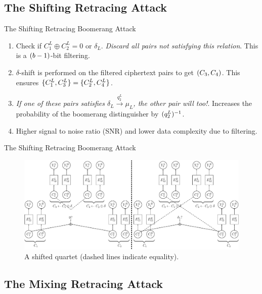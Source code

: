 \documentclass[notheorems]{beamer}
\theoremstyle{definition}
\theoremstyle{example}
\begin{document}
    \subsection{The Shifting Retracing Attack}
    \label{subsec:shift-retr-boomerang}

    \begin{frame}[<+->]{The Shifting Retracing Boomerang Attack}
        \begin{enumerate}
            \item Check if \(C_1^L \oplus C_2^L = 0 \textrm{ or } \delta_L\).
            \emph{Discard all pairs not satisfying this relation}. This is a
            \((b - 1)\)-bit filtering.
            \item \(\delta\)-shift is performed on the filtered ciphertext pairs
            to get \((C_3, C_4)\). This ensures \(\{C_1^L, C_3^L\} =
            \{C_2^L, C_4^L\}\).
            \item \emph{If one of these pairs satisfies \(\delta_L
            \xrightarrow{q_2^L} \mu_L\), the other pair will too!}. Increases
            the probability of the boomerang distinguisher by
            \((q_2^L)^{-1}\).
            \item Higher signal to noise ratio (SNR) and lower data complexity
            due to filtering.
        \end{enumerate}
    \end{frame}

    \begin{frame}{The Shifting Retracing Boomerang Attack}
        \begin{figure}
            \centering
            \includegraphics[width=\columnwidth]{images/shifting_boomerang.png}
            \caption{A shifted quartet (dashed lines indicate equality).}
        \end{figure}
    \end{frame}

    \subsection{The Mixing Retracing Attack}
    \label{subsec:mix-retr-boomerang}
\end{document}

